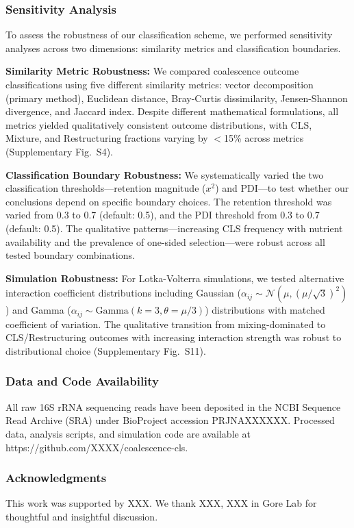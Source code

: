 \subsubsection*{Sensitivity Analysis}
\label{sec:suppl:sensitivity}

To assess the robustness of our classification scheme, we performed sensitivity analyses across two dimensions: similarity metrics and classification boundaries.

\textbf{Similarity Metric Robustness:} We compared coalescence outcome classifications using five different similarity metrics: vector decomposition (primary method), Euclidean distance, Bray-Curtis dissimilarity, Jensen-Shannon divergence, and Jaccard index. Despite different mathematical formulations, all metrics yielded qualitatively consistent outcome distributions, with CLS, Mixture, and Restructuring fractions varying by $<$15\% across metrics (Supplementary Fig.~S4).

\textbf{Classification Boundary Robustness:} We systematically varied the two classification thresholds---retention magnitude ($x^2$) and PDI---to test whether our conclusions depend on specific boundary choices. The retention threshold was varied from 0.3 to 0.7 (default: 0.5), and the PDI threshold from 0.3 to 0.7 (default: 0.5). The qualitative patterns---increasing CLS frequency with nutrient availability and the prevalence of one-sided selection---were robust across all tested boundary combinations.

\textbf{Simulation Robustness:} For Lotka-Volterra simulations, we tested alternative interaction coefficient distributions including Gaussian ($\alpha_{ij} \sim \mathcal{N}(\mu, (\mu/\sqrt{3})^2)$) and Gamma ($\alpha_{ij} \sim \text{Gamma}(k=3, \theta=\mu/3)$) distributions with matched coefficient of variation. The qualitative transition from mixing-dominated to CLS/Restructuring outcomes with increasing interaction strength was robust to distributional choice (Supplementary Fig.~S11).


\subsubsection*{Data and Code Availability}
\label{sec:suppl:data}

All raw 16S rRNA sequencing reads have been deposited in the NCBI Sequence Read Archive (SRA) under BioProject accession PRJNAXXXXXX. Processed data, analysis scripts, and simulation code are available at https://github.com/XXXX/coalescence-cls.


\subsubsection*{Acknowledgments}

This work was supported by XXX. We thank XXX, XXX in Gore Lab for thoughtful and insightful discussion.
